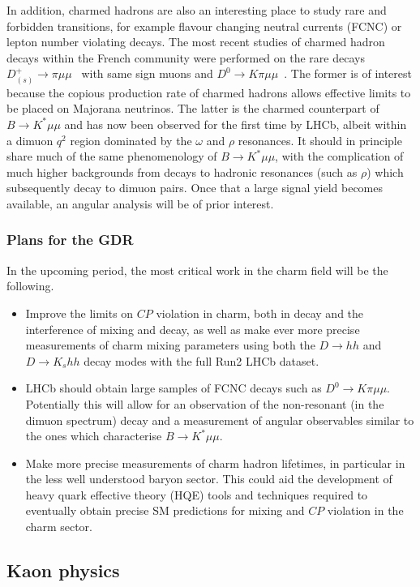 In addition, charmed hadrons are also an interesting place to study rare and forbidden transitions, for example flavour  changing neutral currents (FCNC) or lepton number violating decays. The most recent studies of charmed hadron decays within the French community were performed on the rare decays $D_{(s)}^+ \to \pi \mu\mu$~\cite{Aaij:2013sua} with same sign muons and $D^0 \to K \pi\mu\mu$~\cite{Aaij:2015hva}. The former is of interest because the copious production rate of charmed hadrons allows effective limits to be placed on Majorana neutrinos. The latter is the charmed counterpart of $B\to K^*\mu\mu$ and has now been observed for the first time by LHCb, albeit within a dimuon $q^2$ region dominated by the $\omega$ and $\rho$ resonances. It should in principle share much of the same phenomenology of $B\to K^*\mu\mu$,  with the complication of much higher backgrounds from decays to hadronic resonances (such as $\rho$) which subsequently decay to dimuon pairs. Once that a large signal yield becomes available, an angular analysis will be of prior interest. 

\subsubsection*{Plans for the GDR}
In the upcoming period, the most critical work  in the charm field will be the following.
\begin{itemize}
\item Improve the limits on $CP$ violation in charm, both in decay and the interference of mixing and decay, as well as  make ever more precise measurements of charm mixing parameters using both the $D\to hh$ and $D\to K_s hh$ decay modes with the full Run2  LHCb dataset. \item LHCb should obtain large samples of FCNC decays such as $D^0\to K \pi\mu\mu$.  Potentially this will allow for an observation of the non-resonant (in the dimuon spectrum) decay and a measurement of angular observables similar to the ones which characterise $B\to K^*\mu\mu$. 
\item Make more precise measurements of charm hadron lifetimes, in particular in the less well understood baryon sector. This could aid the development of heavy quark effective theory (HQE) tools and techniques required to eventually obtain precise SM predictions for mixing and $CP$ violation in the charm sector.
\end{itemize}



\subsection*{Kaon physics}

